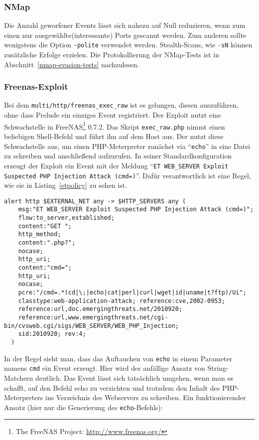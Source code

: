 \subsubsection{NMap}

Die Anzahl geworfener Events lässt sich nahezu auf Null reduzieren, wenn
zum einen nur ausgewählte(interessante) Ports gescannt werden. Zum anderen
sollte wenigstens die Option \texttt{-polite} verwendet werden. Stealth-Scans,
wie \texttt{-sN} können zusätzliche Erfolge erzielen. Die Protokollierung der
NMap-Tests ist in Abschnitt~\ref{nmap-evasion-tests} nachzulesen.

\subsubsection{Freenas-Exploit}

Bei dem  \texttt{multi/http/freenas\_exec\_raw} ist es gelungen,
diesen auszuführen, ohne dass Prelude ein einziges Event
registriert. Der Exploit nutzt eine Schwachstelle in
FreeNAS\footnote{The FreeNAS Project: \url{http://www.freenas.org/}}
0.7.2. Das Skript \texttt{exec\_raw.php} nimmt einen beliebigen Shell-Befehl
und führt ihn auf dem Host aus. Der  nutzt diese Schwachstelle
aus, um einen PHP-Meterpreter zunächst via \enquote{\texttt{echo}} in eine Datei zu
schreiben und anschließend aufzurufen. In seiner Standardkonfiguration
erzeugt der Exploit ein Event mit der Meldung \enquote{\texttt{ET WEB\_SERVER Exploit
Suspected PHP Injection Attack (cmd=)}}. Dafür verantwortlich ist eine Regel, wie
sie in Listing~\ref{etpolicy} zu sehen ist.

\begin{lstlisting}[language={},caption={ET-Policy-Regel (formatiert)},label=etpolicy]
  alert http $EXTERNAL_NET any -> $HTTP_SERVERS any (
    msg:"ET WEB_SERVER Exploit Suspected PHP Injection Attack (cmd=)";
    flow:to_server,established;
    content:"GET ";
    http_method;
    content:".php?";
    nocase;
    http_uri;
    content:"cmd=";
    http_uri;
    nocase;
    pcre:"/cmd=.*(cd|\;|echo|cat|perl|curl|wget|id|uname|t?ftp)/Ui";
    classtype:web-application-attack; reference:cve,2002-0953;
    reference:url,doc.emergingthreats.net/2010920;
    reference:url,www.emergingthreats.net/cgi-bin/cvsweb.cgi/sigs/WEB_SERVER/WEB_PHP_Injection;
    sid:2010920; rev:4;
  )
\end{lstlisting}

In der Regel sieht man, dass das Auftauchen von \texttt{echo} in einem
Parameter namens \texttt{cmd} ein Event erzeugt. Hier wird der anfällige
Ansatz von String-Matchern deutlich. Das Event lässt sich tatsächlich
umgehen, wenn man es schafft, auf den Befehl echo zu verzichten und
trotzdem den Inhalt des PHP-Meterpreters ins Verzeichnis des
Webservers zu schreiben. Ein funktionierender Ansatz (hier nur die
Generierung des \texttt{echo}-Befehls):

